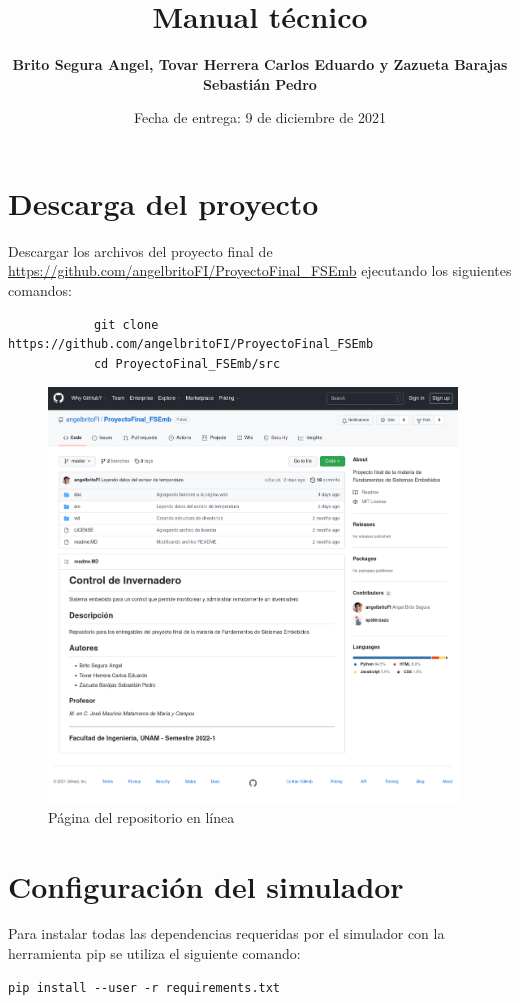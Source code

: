 \documentclass[letterpaper,10.5pt]{article} %
\title{Manual técnico}
\author{\textbf{Brito Segura Angel, Tovar Herrera Carlos Eduardo y Zazueta Barajas Sebastián Pedro}}
\date{Fecha de entrega: 9 de diciembre de 2021}
\begin{document}
    \pagestyle{fancy} %
    \maketitle %
    
    \section{Descarga del proyecto}
	    Descargar los archivos del proyecto final de \url{https://github.com/angelbritoFI/ProyectoFinal_FSEmb} ejecutando los siguientes comandos:
	    \begin{verbatim}
			git clone https://github.com/angelbritoFI/ProyectoFinal_FSEmb
			cd ProyectoFinal_FSEmb/src
		\end{verbatim}
		\begin{figure}[H]
			\centering
			\includegraphics[width=\linewidth, height=11cm]{img/repositorio.png}
			\caption{Página del repositorio en línea} %
			\label{fig:figura1} %
		\end{figure}
		
    \section{Configuración del simulador}
    	Para instalar todas las dependencias requeridas por el simulador con la herramienta pip se utiliza el siguiente comando:
    	\begin{verbatim}pip install --user -r requirements.txt\end{verbatim}
	
\end{document}
